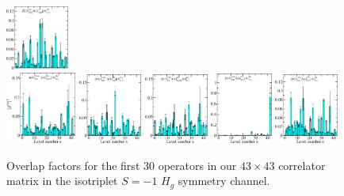 \begin{figure}[H]
    \includegraphics[width=0.185\textwidth]{figures/sigmas/hg/zfactors/zfactor_isotriplet_kbar_nucleon-Hg_1-P111-A2-SS_0-P-1-1-1-G-SS_0.pdf}\\
    \hspace*{-0.1cm}\includegraphics[width=0.206\textwidth]{figures/sigmas/hg/zfactors/zfactor_isotriplet_pion_lambda-Hg_1-P000-A1um-SS_0-P000-Hu-SD_37.pdf}
    \hspace*{-0.05cm}\includegraphics[width=0.185\textwidth]{figures/sigmas/hg/zfactors/zfactor_isotriplet_pion_lambda-Hg_1-P000-A1um-SS_0-P000-Hu-SS_0.pdf}
    \includegraphics[width=0.185\textwidth]{figures/sigmas/hg/zfactors/zfactor_isotriplet_pion_lambda-Hg_1-P001-A2m-SS_1-P00-1-G2-LSD_1.pdf}
    \includegraphics[width=0.18\textwidth]{figures/sigmas/hg/zfactors/zfactor_isotriplet_pion_lambda-Hg_1-P010-A2m-SS_0-P0-10-G1-SS_1.pdf}
    \includegraphics[width=0.185\textwidth]{figures/sigmas/hg/zfactors/zfactor_isotriplet_pion_lambda-Hg_1-P010-A2m-SS_1-P0-10-G1-SS_1.pdf}
    \caption{Overlap factors for the first 30 operators in our $43\times 43$ correlator matrix in the isotriplet $S=-1$ $H_g$ symmetry channel.}\label{fig:hg_zfactors1}
\end{figure}

